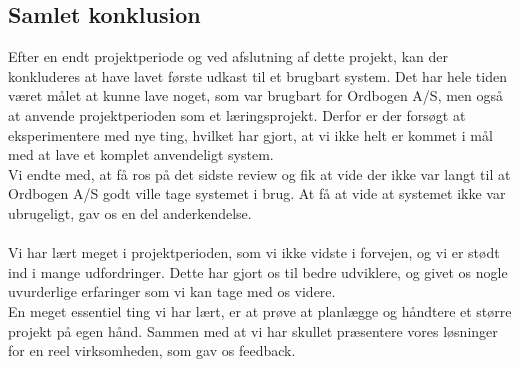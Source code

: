 \subsection{Samlet konklusion}
Efter en endt projektperiode og ved afslutning af dette projekt, kan der konkluderes at have lavet første udkast til et brugbart system.
Det har hele tiden været målet at kunne lave noget, som var brugbart for Ordbogen A/S, men også at anvende projektperioden som et læringsprojekt. 
Derfor er der forsøgt at eksperimentere med nye ting, hvilket har gjort, at vi ikke helt er kommet i mål med at lave et komplet anvendeligt system.
\\
Vi endte med, at få ros på det sidste review og fik at vide der ikke var langt til at Ordbogen A/S godt ville tage systemet i brug.
At få at vide at systemet ikke var ubrugeligt, gav os en del anderkendelse.
\\\\
Vi har lært meget i projektperioden, som vi ikke vidste i forvejen, og vi er stødt ind i mange udfordringer.
Dette har gjort os til bedre udviklere, og givet os nogle uvurderlige erfaringer som vi kan tage med os videre.
\\
En meget essentiel ting vi har lært, er at prøve at planlægge og håndtere et større projekt på egen hånd.
Sammen med at vi har skullet præsentere vores løsninger for en reel virksomheden, som gav os feedback.

